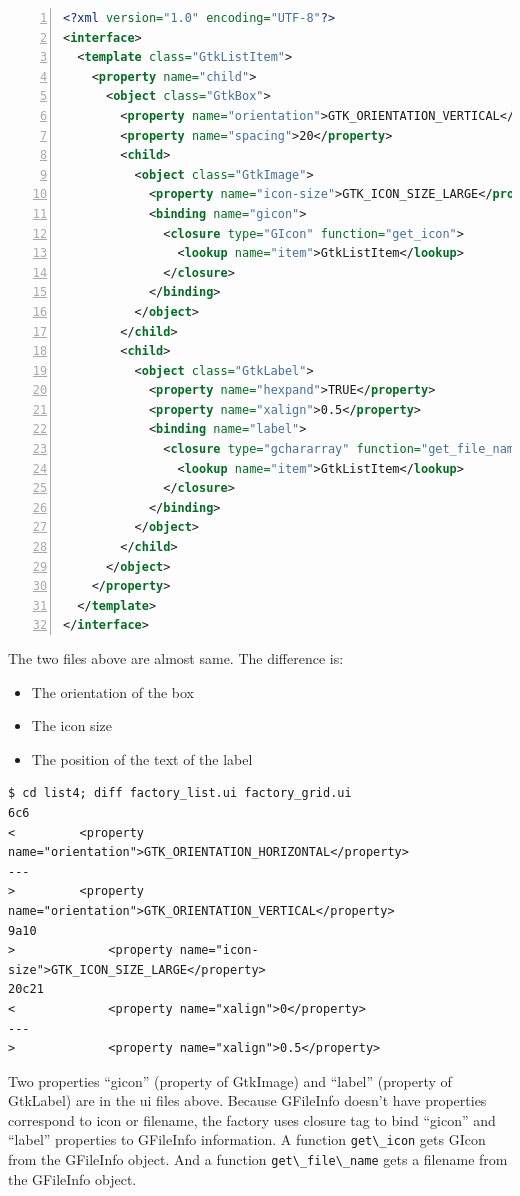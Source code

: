 \begin{lstlisting}[language=XML, numbers=left]
<?xml version="1.0" encoding="UTF-8"?>
<interface>
  <template class="GtkListItem">
    <property name="child">
      <object class="GtkBox">
        <property name="orientation">GTK_ORIENTATION_VERTICAL</property>
        <property name="spacing">20</property>
        <child>
          <object class="GtkImage">
            <property name="icon-size">GTK_ICON_SIZE_LARGE</property>
            <binding name="gicon">
              <closure type="GIcon" function="get_icon">
                <lookup name="item">GtkListItem</lookup>
              </closure>
            </binding>
          </object>
        </child>
        <child>
          <object class="GtkLabel">
            <property name="hexpand">TRUE</property>
            <property name="xalign">0.5</property>
            <binding name="label">
              <closure type="gchararray" function="get_file_name">
                <lookup name="item">GtkListItem</lookup>
              </closure>
            </binding>
          </object>
        </child>
      </object>
    </property>
  </template>
</interface>
\end{lstlisting}

The two files above are almost same. The difference is:

\begin{itemize}
\tightlist
\item
  The orientation of the box
\item
  The icon size
\item
  The position of the text of the label
\end{itemize}

\begin{lstlisting}
$ cd list4; diff factory_list.ui factory_grid.ui
6c6
<         <property name="orientation">GTK_ORIENTATION_HORIZONTAL</property>
---
>         <property name="orientation">GTK_ORIENTATION_VERTICAL</property>
9a10
>             <property name="icon-size">GTK_ICON_SIZE_LARGE</property>
20c21
<             <property name="xalign">0</property>
---
>             <property name="xalign">0.5</property>
\end{lstlisting}

Two properties ``gicon'' (property of GtkImage) and ``label'' (property
of GtkLabel) are in the ui files above. Because GFileInfo doesn't have
properties correspond to icon or filename, the factory uses closure tag
to bind ``gicon'' and ``label'' properties to GFileInfo information. A
function \passthrough{\lstinline!get\_icon!} gets GIcon from the
GFileInfo object. And a function
\passthrough{\lstinline!get\_file\_name!} gets a filename from the
GFileInfo object.


